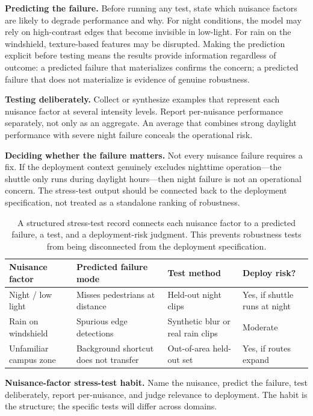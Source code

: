 \textbf{Predicting the failure.} Before running any test, state which nuisance factors are likely to degrade performance and why. For night conditions, the model may rely on high-contrast edges that become invisible in low-light. For rain on the windshield, texture-based features may be disrupted. Making the prediction explicit before testing means the results provide information regardless of outcome: a predicted failure that materializes confirms the concern; a predicted failure that does not materialize is evidence of genuine robustness.

\textbf{Testing deliberately.} Collect or synthesize examples that represent each nuisance factor at several intensity levels. Report per-nuisance performance separately, not only as an aggregate. An average that combines strong daylight performance with severe night failure conceals the operational risk.

\textbf{Deciding whether the failure matters.} Not every nuisance failure requires a fix. If the deployment context genuinely excludes nighttime operation---the shuttle only runs during daylight hours---then night failure is not an operational concern. The stress-test output should be connected back to the deployment specification, not treated as a standalone ranking of robustness.

\begin{table}[t]
\centering
\small
\setlength{\tabcolsep}{4pt}
\begin{tabular}{p{2.29cm}p{2.46cm}p{2.46cm}p{2.46cm}}
\toprule
Nuisance factor & Predicted failure mode & Test method & Deploy risk? \\
\midrule
Night / low light & Misses pedestrians at distance & Held-out night clips & Yes, if shuttle runs at night \\
Rain on windshield & Spurious edge detections & Synthetic blur or real rain clips & Moderate \\
Unfamiliar campus zone & Background shortcut does not transfer & Out-of-area held-out set & Yes, if routes expand \\
\bottomrule
\end{tabular}
\caption{A structured stress-test record connects each nuisance factor to a predicted failure, a test, and a deployment-risk judgment. This prevents robustness tests from being disconnected from the deployment specification.}
\label{tab:robustness-stress-test}
\end{table}

\begin{thinkingtool}
\textbf{Nuisance-factor stress-test habit.} Name the nuisance, predict the failure, test deliberately, report per-nuisance, and judge relevance to deployment. The habit is the structure; the specific tests will differ across domains.
\end{thinkingtool}

